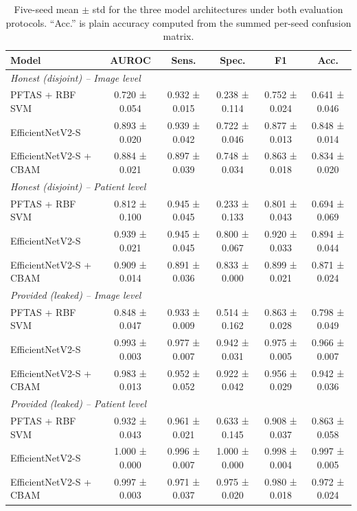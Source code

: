 \begin{table}[t]
\centering
\small
\begin{tabular}{l ccccc}
\toprule
Model & AUROC & Sens. & Spec. & F1 & Acc. \\
\midrule
\multicolumn{6}{l}{\textit{Honest (disjoint) -- Image level}} \\
PFTAS + RBF SVM & 0.720 ± 0.054 & 0.932 ± 0.015 & 0.238 ± 0.114 & 0.752 ± 0.024 & 0.641 ± 0.046 \\
EfficientNetV2-S & 0.893 ± 0.020 & 0.939 ± 0.042 & 0.722 ± 0.046 & 0.877 ± 0.013 & 0.848 ± 0.014 \\
EfficientNetV2-S + CBAM & 0.884 ± 0.021 & 0.897 ± 0.039 & 0.748 ± 0.034 & 0.863 ± 0.018 & 0.834 ± 0.020 \\
\midrule
\multicolumn{6}{l}{\textit{Honest (disjoint) -- Patient level}} \\
PFTAS + RBF SVM & 0.812 ± 0.100 & 0.945 ± 0.045 & 0.233 ± 0.133 & 0.801 ± 0.043 & 0.694 ± 0.069 \\
EfficientNetV2-S & 0.939 ± 0.021 & 0.945 ± 0.045 & 0.800 ± 0.067 & 0.920 ± 0.033 & 0.894 ± 0.044 \\
EfficientNetV2-S + CBAM & 0.909 ± 0.014 & 0.891 ± 0.036 & 0.833 ± 0.000 & 0.899 ± 0.021 & 0.871 ± 0.024 \\
\midrule
\multicolumn{6}{l}{\textit{Provided (leaked) -- Image level}} \\
PFTAS + RBF SVM & 0.848 ± 0.047 & 0.933 ± 0.009 & 0.514 ± 0.162 & 0.863 ± 0.028 & 0.798 ± 0.049 \\
EfficientNetV2-S & 0.993 ± 0.003 & 0.977 ± 0.007 & 0.942 ± 0.031 & 0.975 ± 0.005 & 0.966 ± 0.007 \\
EfficientNetV2-S + CBAM & 0.983 ± 0.013 & 0.952 ± 0.052 & 0.922 ± 0.042 & 0.956 ± 0.029 & 0.942 ± 0.036 \\
\midrule
\multicolumn{6}{l}{\textit{Provided (leaked) -- Patient level}} \\
PFTAS + RBF SVM & 0.932 ± 0.043 & 0.961 ± 0.021 & 0.633 ± 0.145 & 0.908 ± 0.037 & 0.863 ± 0.058 \\
EfficientNetV2-S & 1.000 ± 0.000 & 0.996 ± 0.007 & 1.000 ± 0.000 & 0.998 ± 0.004 & 0.997 ± 0.005 \\
EfficientNetV2-S + CBAM & 0.997 ± 0.003 & 0.971 ± 0.037 & 0.975 ± 0.020 & 0.980 ± 0.018 & 0.972 ± 0.024 \\
\bottomrule
\end{tabular}
\caption{Five-seed mean $\pm$ std for the three model architectures under both evaluation protocols. ``Acc.'' is plain accuracy computed from the summed per-seed confusion matrix.}
\label{tab:master}
\end{table}

